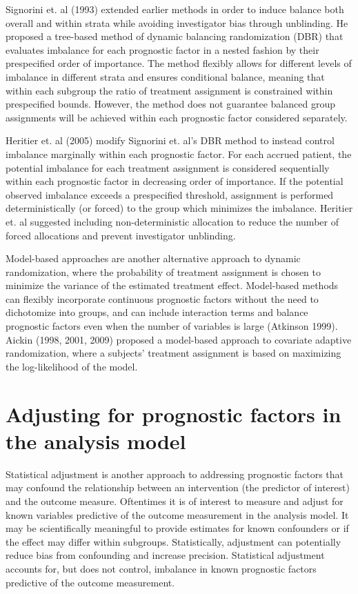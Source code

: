 Signorini et. al (1993) extended earlier methods in order to induce balance both overall and within strata while avoiding investigator bias through unblinding.  
He proposed a tree-based method of dynamic balancing randomization (DBR) that evaluates imbalance for each prognostic factor in a nested fashion by their prespecified order of importance.  
The method flexibly allows for different levels of imbalance in different strata and ensures conditional balance, meaning that within each subgroup the ratio of treatment assignment is constrained within prespecified bounds.  
However, the method does not guarantee balanced group assignments will be achieved within each prognostic factor considered separately. 

Heritier et. al (2005) modify Signorini et. al’s DBR method to instead control imbalance marginally within each prognostic factor.
For each accrued patient, the potential imbalance for each treatment assignment is considered sequentially within each prognostic factor in decreasing order of importance.  
If the potential observed imbalance exceeds a prespecified threshold, assignment is performed deterministically (or forced) to the group which minimizes the imbalance.  
Heritier et. al suggested including non-deterministic allocation to reduce the number of forced allocations and prevent investigator unblinding.

Model-based approaches are another alternative approach to dynamic randomization, where the probability of treatment assignment is chosen to minimize the variance of the estimated treatment effect. 
Model-based methods can flexibly incorporate continuous prognostic factors without the need to dichotomize into groups, and can include interaction terms and balance prognostic factors even when the number of variables is large (Atkinson 1999).  
Aickin (1998, 2001, 2009) proposed a model-based approach to covariate adaptive randomization, where a subjects’ treatment assignment is based on maximizing the log-likelihood of the model. 

\section{Adjusting for prognostic factors in the analysis model}
Statistical adjustment is another approach to addressing prognostic factors that may confound the relationship between an intervention (the predictor of interest) and the outcome measure.
Oftentimes it is of interest to measure and adjust for known variables predictive of the outcome measurement in the analysis model. 
It may be scientifically meaningful to provide estimates for known confounders or if the effect may differ within subgroups. 
Statistically, adjustment can potentially reduce bias from confounding and increase precision.
Statistical adjustment accounts for, but does not control, imbalance in known prognostic factors predictive of the outcome measurement. 

